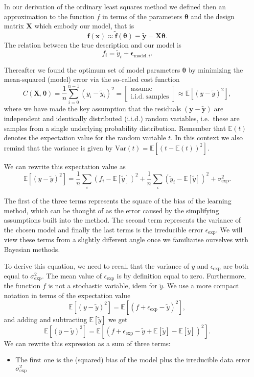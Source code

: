 \documentclass[%
oneside,                 %
final,                   %
10pt]{article}
\begin{document}
In our derivation of the ordinary least squares method we defined then
an approximation to the function $f$ in terms of the parameters
$\bm{\theta}$ and the design matrix $\bm{X}$ which embody our model,
that is 
\[
\bm{f}(\bm{x}) \approx \bm{\tilde{f}}(\bm{\theta}) \equiv \bm{\tilde{y}}=\bm{X}\bm{\theta}. 
\]
The relation between the true description and our model is
\[
f_i = \tilde{y}_i + \bm{\epsilon}_{\mathrm{model},i}.
\]

Thereafter we found the optimum set of model parameters $\bm{\theta}$ by minimizing the mean-squared (model) error via the so-called cost function
\[
C(\bm{X},\bm{\theta}) =\frac{1}{n}\sum_{i=0}^{n-1}(y_i-\tilde{y}_i)^2 = 
\left[ \begin{array}{c}
\mathrm{assume}\\
\mathrm{i.i.d.~samples}
\end{array} \right]
\approx
\mathbb{E}\left[(y-\tilde{y})^2\right],
\]
where we have made the key assumption that the residuals $(\bm{y}-\bm{\tilde{y}})$ are independent and identically distributed (i.i.d.) random variables, i.e.~these are samples from a single underlying probability distribution. Remember that $\mathbb{E}(t)$ denotes the expectation value for the random variable $t$. In this context we also remind that the variance is given by $\mathrm{Var}(t) = \mathbb{E} \left[ \left(t -  \mathbb{E}(t)\right)^2 \right]$.

We can rewrite this expectation value as 
\[
\mathbb{E}\left[(y-\tilde{y})^2\right]=\frac{1}{n}\sum_i(f_i-\mathbb{E}\left[\tilde{y}\right])^2+\frac{1}{n}\sum_i(\tilde{y}_i-\mathbb{E}\left[\tilde{y}\right])^2+\sigma^2_\mathrm{exp}.
\]

The first of the three terms represents the square of the bias of the learning
method, which can be thought of as the error caused by the simplifying
assumptions built into the method. The second term represents the
variance of the chosen model and finally the last terms is the irreducible error $\epsilon_\mathrm{exp}$. We will view these terms from a slightly different angle once we familiarise ourselves with Bayesian methods.

To derive this equation, we need to recall that the variance of $y$ and $\epsilon_\mathrm{exp}$ are both equal to $\sigma^2_\mathrm{exp}$. The mean value of $\epsilon_\mathrm{exp}$ is by definition equal to zero. Furthermore, the function $f$ is not a stochastic variable, idem for $\tilde{y}$.
We use a more compact notation in terms of the expectation value 
\[
\mathbb{E}\left[(y-\tilde{y})^2\right]=\mathbb{E}\left[({f}+\epsilon_\mathrm{exp}-\tilde{y})^2\right],
\]
and adding and subtracting $\mathbb{E}\left[\tilde{y}\right]$ we get
\[
\mathbb{E}\left[(y-\tilde{y})^2\right]=\mathbb{E}\left[({f}+\epsilon_\mathrm{exp}-\tilde{y}+\mathbb{E}\left[\tilde{y}\right]-\mathbb{E}\left[\tilde{y}\right])^2\right].
\]
We can rewrite this expression as a sum of three terms:
\begin{itemize}
\item The first one is the (squared) bias of the model plus the irreducible data error $\sigma_\mathrm{exp}^2$
\end{itemize}
\end{document}
